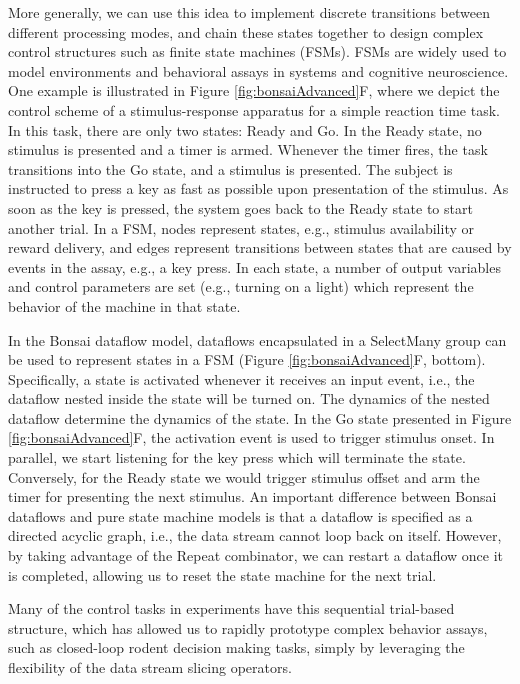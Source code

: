 More generally, we can use this idea to implement discrete transitions between different processing modes, and chain these states together to design complex control structures such as finite state machines (FSMs). FSMs are widely used to model environments and behavioral assays in systems and cognitive neuroscience. One example is illustrated in Figure \ref{fig:bonsaiAdvanced}F, where we depict the control scheme of a stimulus-response apparatus for a simple reaction time task. In this task, there are only two states: Ready and Go. In the Ready state, no stimulus is presented and a timer is armed. Whenever the timer fires, the task transitions into the Go state, and a stimulus is presented. The subject is instructed to press a key as fast as possible upon presentation of the stimulus. As soon as the key is pressed, the system goes back to the Ready state to start another trial. In a FSM, nodes represent states, e.g., stimulus availability or reward delivery, and edges represent transitions between states that are caused by events in the assay, e.g., a key press. In each state, a number of output variables and control parameters are set (e.g., turning on a light) which represent the behavior of the machine in that state.

In the Bonsai dataflow model, dataflows encapsulated in a SelectMany group can be used to represent states in a FSM (Figure \ref{fig:bonsaiAdvanced}F, bottom). Specifically, a state is activated whenever it receives an input event, i.e., the dataflow nested inside the state will be turned on. The dynamics of the nested dataflow determine the dynamics of the state. In the Go state presented in Figure \ref{fig:bonsaiAdvanced}F, the activation event is used to trigger stimulus onset. In parallel, we start listening for the key press which will terminate the state. Conversely, for the Ready state we would trigger stimulus offset and arm the timer for presenting the next stimulus. An important difference between Bonsai dataflows and pure state machine models is that a dataflow is specified as a directed acyclic graph, i.e., the data stream cannot loop back on itself. However, by taking advantage of the Repeat combinator, we can restart a dataflow once it is completed, allowing us to reset the state machine for the next trial.

Many of the control tasks in experiments have this sequential trial-based structure, which has allowed us to rapidly prototype complex behavior assays, such as closed-loop rodent decision making tasks, simply by leveraging the flexibility of the data stream slicing operators.

